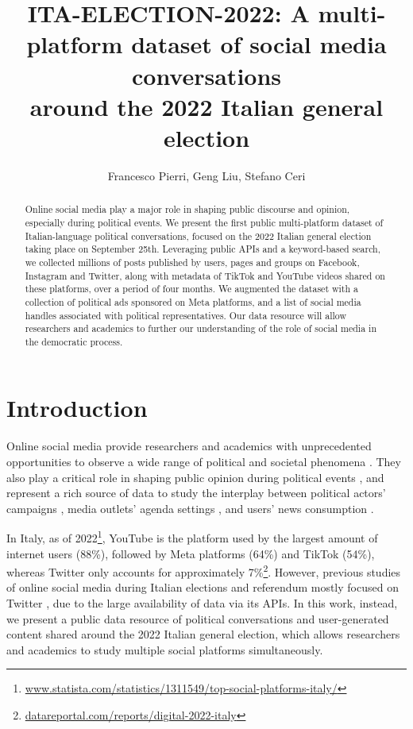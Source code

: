 \documentclass[letterpaper]{article} %
\title{ITA-ELECTION-2022: A multi-platform dataset of social media conversations \\ around the 2022 Italian general election}
\author{Francesco Pierri, Geng Liu, Stefano Ceri}
\begin{document}
\maketitle

\setcounter{footnote}{0}


\begin{abstract}
Online social media play a major role in shaping public discourse and opinion, especially during political events.
We present the first public multi-platform dataset of Italian-language political conversations, focused on the 2022 Italian general election taking place on September 25th. Leveraging public APIs and a keyword-based search, we collected millions of posts published by users, pages and groups on Facebook, Instagram and Twitter, along with metadata of TikTok and YouTube videos shared on these platforms, over a period of four months. We augmented the dataset with a collection of political ads sponsored on Meta platforms, and a list of social media handles associated with political representatives. Our data resource will allow researchers and academics to further our understanding of the role of social media in the democratic process.
\end{abstract}

\section{Introduction}
Online social media provide researchers and academics with unprecedented opportunities to observe a wide range of political and societal phenomena \cite{rossi2021nearly}. They also play a critical role in shaping public opinion during political events \cite{vitak2011s}, and represent a rich source of data to study the interplay between political actors’ campaigns \cite{sahly2019social}, media outlets’ agenda settings \cite{kim2016first}, and users’ news consumption \cite{allcott2017social}. 

In Italy, as of 2022\footnote{\url{www.statista.com/statistics/1311549/top-social-platforms-italy/}}, YouTube is the platform used by the largest amount of internet users (88\%), followed by Meta platforms (64\%) and TikTok (54\%), whereas Twitter only accounts for approximately 7\%\footnote{\url{datareportal.com/reports/digital-2022-italy}}. However, previous studies of online social media during Italian elections and referendum mostly focused on Twitter \cite{rossi2021nearly}, due to the large availability of data via its APIs. In this work, instead, we present a public data resource of political conversations and user-generated content shared around the 2022 Italian general election, which allows researchers and academics to study multiple social platforms simultaneously.
\end{document}
